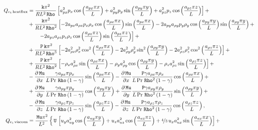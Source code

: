 \documentclass[10pt]{article}
\newcommand{\diff}[2] {\dfrac{\partial #1}{\partial #2}}
\newcommand{\Rho}{\,\mathtt{Rho}}
\newcommand{\PP}{\,\mathtt{P}}
\newcommand{\U}{\,\mathtt{U}}
\newcommand{\Mu}{\,\mathtt{Mu}}
\newcommand{\DMuDx}{\diff{\Mu}{x}}
\newcommand{\DMuDy}{\diff{\Mu}{y}}
\newcommand{\DMuDz}{\diff{\Mu}{z}}
\begin{document}
\begin{equation*}
\begin{split}
%
%
 Q_{e_t \, \text{heatflux}}&= 
\frac{\texttt{k} \pi^{2} }{R L^{2} \Rho \, }\left[a_{px}^{2} p_{x} \cos\left(\frac{a_{px} \pi x}{L}\right) + a_{py}^{2} p_{y} \sin\left(\frac{a_{py} \pi y}{L}\right) + a_{pz}^{2} p_{z} \cos\left(\frac{a_{pz} \pi z}{L}\right)\right] +\\
&+ \frac{\texttt{k} \pi^{2} }{R L^{2} \Rho^{2}}\left[- 2 a_{px} a_{\rho x} p_{x} \rho_{x} \cos\left(\frac{a_{\rho x} \pi x}{L}\right) \sin\left(\frac{a_{px} \pi x}{L}\right) - 2 a_{py} a_{\rho y} p_{y} \rho_{y} \cos\left(\frac{a_{py} \pi y}{L}\right) \sin\left(\frac{a_{\rho y} \pi y}{L}\right) +\right.\\
 &\qquad\left.- 2 a_{pz} a_{\rho z} p_{z} \rho_{z} \cos\left(\frac{a_{\rho z} \pi z}{L}\right) \sin\left(\frac{a_{pz} \pi z}{L}\right)\right] +\\
&+ \frac{\PP \, \texttt{k} \pi^{2} }{R L^{2} \Rho^{3}}\left[- 2 a_{\rho x}^{2} \rho_{x}^{2} \cos^{2}\left(\frac{a_{\rho x} \pi x}{L}\right) - 2 a_{\rho y}^{2} \rho_{y}^{2} \sin^{2}\left(\frac{a_{\rho y} \pi y}{L}\right) - 2 a_{\rho z}^{2} \rho_{z}^{2} \cos^{2}\left(\frac{a_{\rho z} \pi z}{L}\right)\right] +\\
&+ \frac{\PP \, \texttt{k} \pi^{2} }{R L^{2} \Rho^{2}}\left[- \rho_{x} a_{\rho x}^{2} \sin\left(\frac{a_{\rho x} \pi x}{L}\right) - \rho_{y} a_{\rho y}^{2} \cos\left(\frac{a_{\rho y} \pi y}{L}\right) - \rho_{z} a_{\rho z}^{2} \sin\left(\frac{a_{\rho z} \pi z}{L}\right)\right]+\\
%
&- \DMuDx \frac{\gamma a_{px} \pi p_{x} }{L\, \text{Pr} \, \Rho \left(1 - \gamma\right)} \sin\left(\frac{ a_{px} \pi x}{L}\right)
- \DMuDx \frac{\PP \gamma  a_{\rho x} \pi \rho_{x} }{L\, \text{Pr} \, \Rho^{2} \left(1 - \gamma\right)} \cos\left(\frac{ a_{\rho x} \pi x}{L}\right)+\\
&+\DMuDy \frac{\gamma a_{py} \pi p_{y} }{L\, \text{Pr} \, \Rho \left(1 - \gamma\right)} \cos\left(\frac{ a_{py} \pi y}{L}\right)
+ \DMuDy \frac{\PP \gamma  a_{\rho y} \pi \rho_{y} }{L\, \text{Pr} \, \Rho^{2} \left(1 - \gamma\right)} \sin\left(\frac{ a_{\rho y} \pi y}{L}\right)+\\
&- \DMuDz \frac{\gamma a_{pz} \pi p_{z} }{L\, \text{Pr} \, \Rho \left(1 - \gamma\right)}\sin\left(\frac{ a_{pz} \pi z}{L}\right) - \DMuDz \frac{\PP \gamma  a_{\rho z} \pi \rho_{z} }{L\, \text{Pr} \, \Rho^{2} \left(1 - \gamma\right)}\cos\left(\frac{ a_{\rho z} \pi z}{L}\right),\\
%
%
 Q_{e_t \, \text{viscous}}&= 
\frac{\Mu \pi^{2} }{L^{2}}\left\{\U \, \left[u_{y} a_{uy}^{2} \cos\left(\frac{a_{uy} \pi y}{L}\right) + u_{z} a_{uz}^{2} \cos\left(\frac{a_{uz} \pi z}{L}\right) + \nicefrac{4}{3} \, u_{x} a_{ux}^{2} \sin\left(\frac{a_{ux} \pi x}{L}\right)\right] +\right.\\

\end{split}
\end{equation*}
\end{document}
